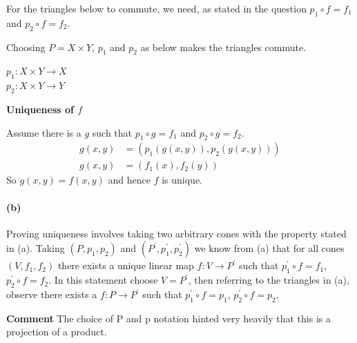 \documentclass{article}
\begin{document}
For the triangles below to commute, we need, as stated in the question $p_1 \circ f = f_1$ and $p_2 \circ f = f_2$.\\
\begin{center}

 \break\hfill

\end{center}
Choosing $P=X\times{Y}$, $p_1$ and $p_2$ as below makes the triangles commute.
\begin{center}
$p_1\colon X\times{Y} \rightarrow X$ \\
$p_2\colon X\times{Y} \rightarrow Y$
\end{center}

\textbf{Uniqueness of $f$}

Assume there is a $g$ such that $p_1 \circ g = f_1$ and $p_2 \circ g = f_2$.
\begin{align*}
	g(x, y) &= (p_1(g(x, y)), p_2(g(x,y))) \\
	g(x, y) &= (f_1(x), f_2(y))
\end{align*}
So $g(x,y) = f(x,y)$ and hence $f$ is unique.

\paragraph{(b)}

Proving uniqueness involves taking two arbitrary cones with the property stated in (a).
Taking $(P, p_1, p_2)$ and $(P^\prime, p_1^\prime, p_2^\prime)$
we know from (a) that for all cones $(V, f_1, f_2)$ there exists a unique linear map $f\colon V \rightarrow P^\prime$ such that $p_1^\prime \circ f = f_1$, $p_2^\prime \circ f = f_2$.
In this statement choose $V=P^\prime$, then referring to the triangles in (a), observe there exists a $f\colon P \rightarrow P^\prime$ such that $p_1^\prime \circ f = p_1$, $p_2^\prime \circ f = p_2$.

\textbf{Comment} The choice of P and p notation hinted very heavily that this is a projection of a product.
\end{document}
